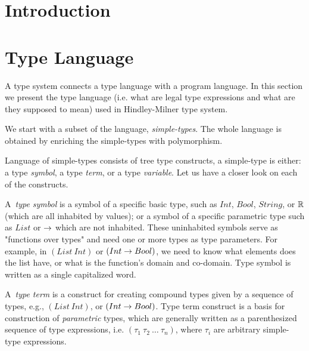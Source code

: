 \documentclass[a4paper,oneside]{memoir}
\begin{document}
\section{Introduction}


\section{Type Language}
\label{sec:typelang}


A type system connects a type language with a program language.
In this section we present the type language (i.e. what are legal type expressions and what are they supposed to mean) used in Hindley-Milner type system.

We start with a subset of the language, \textit{simple-types}.
The whole language is obtained by enriching the simple-types with polymorphism.

Language of simple-types consists of tree type constructs, a simple-type is either: 
a type \textit{symbol}, 
a type \textit{term}, 
or a type \textit{variable}.
Let us have a closer look on each of the constructs.

A~\textit{type symbol} is a symbol of a specific basic type, such as 
$Int$, $Bool$, $String$, or $\mathbb{R}$ (which are all inhabited by values); 
or a symbol of a specific parametric type such as $List$ or $\rightarrow$ 
which are not inhabited. These uninhabited symbols serve as "functions over types" 
and need one or more types as type parameters. For example, in $(List~Int)$
or $(Int \rightarrow Bool)$, we need to know what elements does the list have, 
or what is the function's domain and co-domain. Type symbol is written as 
a single capitalized word.

A~\textit{type term} is a construct for creating compound types given 
by a sequence of types, e.g., $(List~Int)$, or $(Int \rightarrow Bool)$. 
Type term construct is a basis for construction of \textit{parametric} types,
which are generally written as a parenthesized sequence of type expressions, 
i.e. $(\tau_1~\tau_2~\dots~\tau_n)$, where $\tau_i$ are arbitrary 
simple-type expressions.
\end{document}
